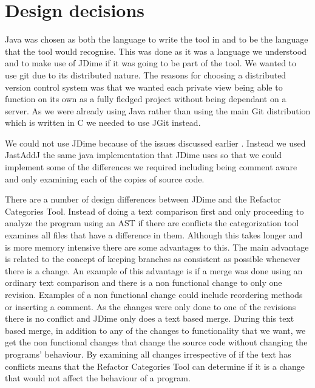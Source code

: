 
\section{Design decisions}
Java was chosen as both the language to write the tool in and to be the language that the tool would recognise.  This was done as it was a language we understood and to make use of JDime if it was going to be part of the tool.  We wanted to use git due to its distributed nature.  The reasons for choosing a distributed version control system was that we wanted each private view being able to function on its own as a fully fledged project without being dependant on a server.  As we were already using Java rather than using the main Git distribution which is written in C we needed to use JGit instead.    

We could not use JDime because of the issues discussed earlier . Instead we used JastAddJ the same java implementation that JDime uses so that we could implement some of the differences we required including being comment aware and only examining each of the copies of source code.

There are a number of design differences between JDime and the Refactor Categories Tool.  Instead of doing a text comparison first and only proceeding to analyze the program using an AST if there are conflicts the categorization tool examines all files that have a difference in them.  Although this takes longer and is more memory intensive there are some advantages to this. The main advantage is related to the concept of keeping branches as consistent as possible whenever there is a change. An example of this advantage is if a merge was done using an ordinary text comparison and there is a non functional change to only one revision. Examples of a non functional change could include reordering methods or inserting a comment.  As the changes were only done to one of the revisions there is no conflict and JDime only does a text based merge.  During this text based merge, in addition to any of the changes to functionality that we want, we get the non functional changes that change the source code without changing the programs' behaviour. By examining all changes irrespective of if the text has conflicts means that the Refactor Categories Tool can determine if it is a change that would not affect the behaviour of a program.

